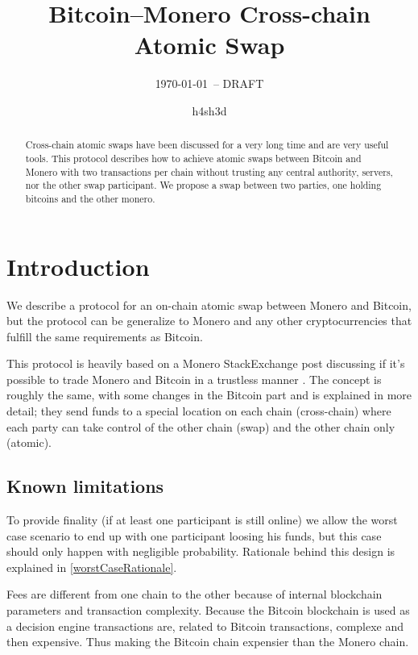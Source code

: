 \documentclass{llncs}
\begin{document}
\title{Bitcoin--Monero Cross-chain Atomic Swap}
\author{h4sh3d}

\subtitle{{\normalsize\today{\small\ -- DRAFT}}}

\maketitle

\begin{abstract}
    Cross-chain atomic swaps have been discussed for a very long time and are very useful tools. This protocol describes how to achieve atomic swaps between Bitcoin and Monero with two transactions per chain without trusting any central authority, servers, nor the other swap participant. We propose a swap between two parties, one holding bitcoins and the other monero.
\end{abstract}

\section{Introduction}
We describe a protocol for an on-chain atomic swap between Monero and Bitcoin, but the protocol can be generalize to Monero and any other cryptocurrencies that fulfill the same requirements as Bitcoin.

This protocol is heavily based on a Monero StackExchange post discussing if it's possible to trade Monero and Bitcoin in a trustless manner \cite{MoneroStackexchangeSwap}. The concept is roughly the same, with some changes in the Bitcoin part and is explained in more detail; they send funds to a special location on each chain (cross-chain) where each party can take control of the other chain (swap) and the other chain only (atomic).

\subsection{Known limitations}
To provide finality (if at least one participant is still online) we allow the worst case scenario to end up with one participant loosing his funds, but this case should only happen with negligible probability. Rationale behind this design is explained in \ref{worstCaseRationale}.

Fees are different from one chain to the other because of internal blockchain parameters and transaction complexity. Because the Bitcoin blockchain is used as a decision engine transactions are, related to Bitcoin transactions, complexe and then expensive. Thus making the Bitcoin chain expensier than the Monero chain.
\end{document}
